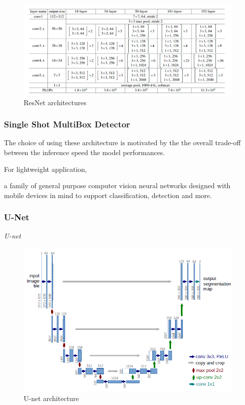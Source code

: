 \begin{figure}
\centerline{\includegraphics[scale=0.4]{images/chapter_2/resnet.png}}
\caption{ResNet architectures \citep{he2016deep}}
\label{fig:resnet_architectures}
\end{figure}


\subsubsection{Single Shot MultiBox Detector}

The choice of using these architecture is motivated by the the overall trade-off between the inference speed the model performances.

For lightweight application, 

a family of general purpose computer vision neural networks designed with mobile devices in mind to support classification, detection and more. 

\subsubsection{U-Net}

\textit{U-net}

\begin{figure}
\centerline{\includegraphics[scale=0.6]{images/chapter_2/unet.png}}
\caption{U-net architecture \citep{ronneberger2015u}}
\label{fig:resnet_architectures}
\end{figure}

